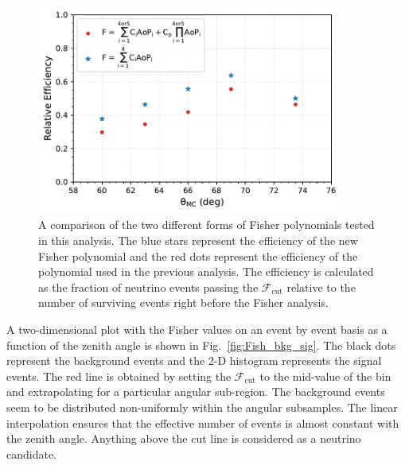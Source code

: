 \begin{figure}[h!]
  \centering
  \includegraphics[width=0.9\textwidth]{thesis_figures/Nu_analysis/Nu_eff/Fisher_efficencies_theta_F_wnt_redcut.pdf}
  \caption{A comparison of the two different forms of Fisher polynomials tested in this analysis. The blue stars represent the efficiency of the new Fisher polynomial and the red dots represent the efficiency of the polynomial used in the previous analysis. The efficiency is calculated as the fraction of neutrino events passing the $\mathcal{F}_{\text{cut}}$ relative to the number of surviving events right before the Fisher analysis.}
  \label{fig:Fishpol_v_theta}
\end{figure}

A two-dimensional plot with the Fisher values on an event by event basis as a function of the zenith angle is shown in Fig.~\ref{fig:Fish_bkg_sig}. The black dots represent the background events and the 2-D histogram represents the signal events. The red line is obtained by setting the $\mathcal{F}_{\text{cut}}$ to the mid-value of the bin and extrapolating for a particular angular sub-region. The background events seem to be distributed non-uniformly within the angular subsamples. The linear interpolation ensures that the effective number of events is almost constant with the zenith angle. Anything above the cut line is considered as a neutrino candidate. 

